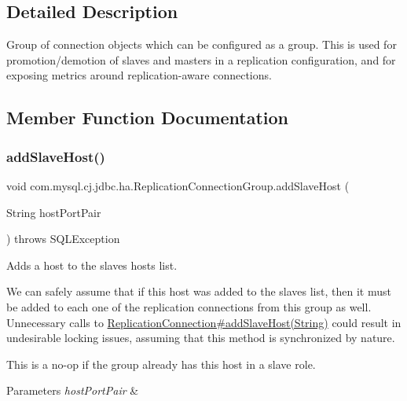 \subsection{Detailed Description}
Group of connection objects which can be configured as a group. This is used for promotion/demotion of slaves and masters in a replication configuration, and for exposing metrics around replication-\/aware connections. 

\subsection{Member Function Documentation}
\mbox{\label{classcom_1_1mysql_1_1cj_1_1jdbc_1_1ha_1_1_replication_connection_group_af6b5ef78b532f8eb4cf0529d482076f3}} 
\subsubsection{\texorpdfstring{add\+Slave\+Host()}{addSlaveHost()}}
{\footnotesize\ttfamily void com.\+mysql.\+cj.\+jdbc.\+ha.\+Replication\+Connection\+Group.\+add\+Slave\+Host (\begin{DoxyParamCaption}\item[{String}]{host\+Port\+Pair }\end{DoxyParamCaption}) throws S\+Q\+L\+Exception}

Adds a host to the slaves hosts list.

We can safely assume that if this host was added to the slaves list, then it must be added to each one of the replication connections from this group as well. Unnecessary calls to \mbox{\hyperlink{interfacecom_1_1mysql_1_1cj_1_1jdbc_1_1ha_1_1_replication_connection_ace5387750423fcebedca50789d44a26c}{Replication\+Connection\#add\+Slave\+Host(\+String)}} could result in undesirable locking issues, assuming that this method is synchronized by nature.

This is a no-\/op if the group already has this host in a slave role.


\begin{DoxyParams}{Parameters}
{\em host\+Port\+Pair} & \\
\hline
\end{DoxyParams}


